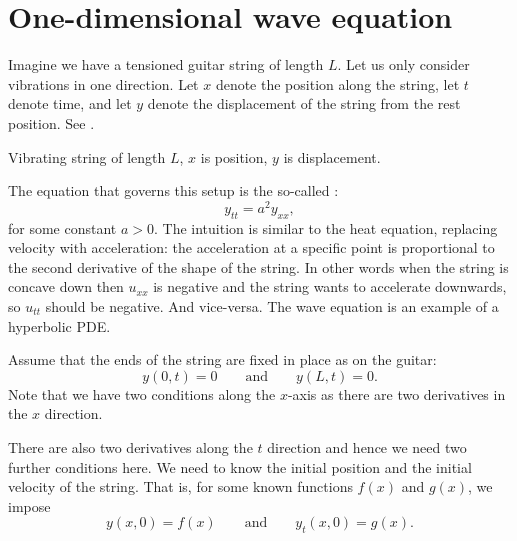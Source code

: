 
\sectionnewpage
\section{One-dimensional wave equation} \label{we:section}


Imagine we have a tensioned guitar string of length $L$.  Let us 
only consider vibrations in one direction.  Let
$x$ denote the position along the string, let $t$ denote time, and let $y$
denote the displacement of the string from the rest position.
See
.

\begin{myfig}
\capstart
{}
\caption{Vibrating string of length $L$, $x$ is position, $y$ is displacement.\label{we:vibstrfig}}
\end{myfig}

The equation that governs this setup is the so-called
\emph{}:
\begin{equation*}
\boxed{~~
y_{tt} =
a^2 y_{xx} ,
~~}
\end{equation*}
for some constant $a > 0$.
The intuition is similar to the heat equation, replacing velocity with
acceleration: the acceleration at a specific point is proportional to the second
derivative of the shape of the string.  In other words
when the string is
concave down then $u_{xx}$ is negative and the string wants to accelerate
downwards, so $u_{tt}$ should be negative.  And vice-versa.
The wave equation is an example of a hyperbolic PDE.

Assume that the ends of the string are fixed in place as on the guitar:
\begin{equation*}
y(0,t) = 0 \qquad \text{and} \qquad y(L,t) = 0.
\end{equation*}
Note that we have two conditions along the $x$-axis as there are
two derivatives in the $x$ direction.

There are also two derivatives along the $t$ direction and hence we need
two further conditions here.  We need to know the initial position
and the initial velocity of the string.  That is,
for some known functions $f(x)$ and $g(x)$, we impose
\begin{equation*}
y(x,0) = f(x)  \qquad \text{and} \qquad y_t (x,0) =
g(x) .
\end{equation*}

